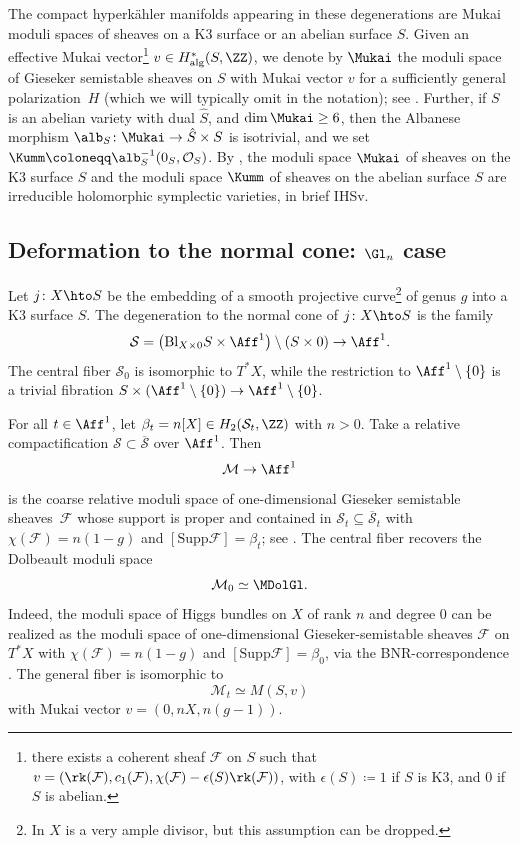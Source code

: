 The compact hyperkähler manifolds appearing in these degenerations are Mukai moduli spaces of sheaves on a K3 surface or an abelian surface $S$. Given an effective Mukai vector\footnote{\ie there exists a coherent sheaf $\mathcal{F}$ on $S$ such that $v = (\rk(\mathcal{F}), c_1(\mathcal{F}), \chi(\mathcal{F})-\epsilon(S)\rk(\mathcal{F}))$, with $\epsilon(S)\coloneqq 1$ if $S$ is K3, and $0$ if $S$ is abelian.} $v \in H^{*}_{\mathrm{alg}}(S, \ZZ)$, we denote by $\Mukai$ the moduli space of Gieseker semistable sheaves on $S$ with Mukai vector $v$
for a sufficiently general polariza\-tion~$H$ (which we will typically omit in the notation); see \cite[\S 1]{Simpson1994I}. Further, if $S$ is an abelian variety with dual $\hat{S}$, and $\dim \Mukai\geq 6$,
then the Albanese morphism
$\alb_S\colon \Mukai \to \hat{S} \times S$
is isotrivial, and we set
$\Kumm \coloneqq \alb_S^{-1}(0_S, \mathcal{O}_S)$. By \cite{PeregoRapagnetta18}, the moduli space $\Mukai$ of sheaves on the K3 surface $S$ and the moduli space $\Kumm$ of sheaves on the abelian surface $S$ are irreducible holomorphic symplectic varieties, in brief IHSv.

\subsection{Deformation to the normal cone: $\Gl_n$ case}
Let $j \colon X \hto S$ be the embedding of a smooth projective curve\footnote{In \cite{DEL97} $X$ is a very ample divisor, but this assumption can be dropped.} of genus $g$ into a K3 surface $S$. The degeneration to the normal cone of $j \colon X \hto S$ is the family
\[
\mathcal{S}=\left(\mathrm{Bl}_{X\times 0}S\times \Aff^1\right)\setminus \left( S\times 0\right)\to \Aff^1.
\]
The central fiber $\mathcal{S}_0$ is isomorphic to $T^*X$, while the restriction to $\Aff^1 \setminus \{0\}$ is a trivial fibration
$S\times (\Aff^1 \setminus \{0\})\to \Aff^1 \setminus \{0\}$.

For all $t\in \Aff^1$, let $\beta_t=n[X]\in H_2(\mathcal{S}_t,\ZZ)$ with $n>0$. Take a relative compactification $\mathcal{S} \subset \overline{\mathcal{S}}$ over $\Aff^1$. Then
\[
\mathcal{M} \to \Aff^1
\]
is the coarse relative moduli space of one-dimensional Gieseker semistable sheaves~$\mathcal{F}$ whose support is proper and contained in $\mathcal{S}_t \subseteq \overline{\mathcal{S}}_t$ with $\chi(\mathcal{F})=n(1-g)$ and $[\mathrm{Supp}\mathcal{F}]=\beta_t$; see \cite[Th.\,1.21]{Simpson1994I}. The central fiber recovers the Dolbeault moduli space
\[
\mathcal{M}_0 \simeq \MDolGl.
\]
Indeed, the moduli space of Higgs bundles on $X$ of rank $n$ and degree $0$ can be realized as the moduli space of one-dimensional Gieseker-semistable sheaves $\mathcal{F}$ on $T^*X$ with $\chi(\mathcal{F})=n(1-g)$ and $[\mathrm{Supp}\mathcal{F}]=\beta_0$, via the BNR-correspondence \cite{BNR89}. The general fiber is isomorphic to
\[
\mathcal{M}_t \simeq M(S,v)
\]
with Mukai vector $v=(0,nX, n(g-1))$.

